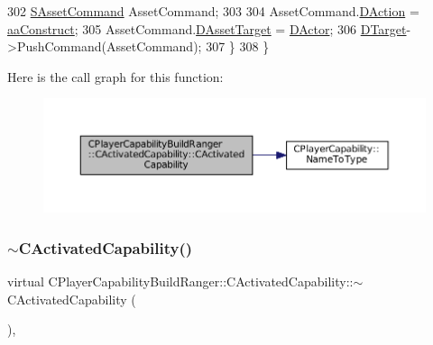 \begin{DoxyCode}
302         \hyperlink{structSAssetCommand}{SAssetCommand} AssetCommand;
303 
304         AssetCommand.\hyperlink{structSAssetCommand_a8edd3b3d59a76d5514ba403bc8076a75}{DAction} = \hyperlink{GameDataTypes_8h_ab47668e651a3032cfb9c40ea2d60d670a7ef6b863f66dd7dcc95a199cd758ae1d}{aaConstruct};
305         AssetCommand.\hyperlink{structSAssetCommand_a3d9b43f6e59c386c48c41a65448a0c39}{DAssetTarget} = \hyperlink{classCActivatedPlayerCapability_a54ca944b47bff2718330639941d402b0}{DActor};
306         \hyperlink{classCActivatedPlayerCapability_a8a1cf50b6501bcfd55af0c935828e395}{DTarget}->PushCommand(AssetCommand);
307     \}
308 \}
\end{DoxyCode}
Here is the call graph for this function\+:\nopagebreak
\begin{figure}[H]
\begin{center}
\leavevmode
\includegraphics[width=350pt]{classCPlayerCapabilityBuildRanger_1_1CActivatedCapability_a8b462671b0888c5374f4196b04d411d6_cgraph}
\end{center}
\end{figure}
\hypertarget{classCPlayerCapabilityBuildRanger_1_1CActivatedCapability_afd5d1ba5ad2b35faa67e4574627d46e1}{}\label{classCPlayerCapabilityBuildRanger_1_1CActivatedCapability_afd5d1ba5ad2b35faa67e4574627d46e1} 
\subsubsection{\texorpdfstring{$\sim$\+C\+Activated\+Capability()}{~CActivatedCapability()}}
{\footnotesize\ttfamily virtual C\+Player\+Capability\+Build\+Ranger\+::\+C\+Activated\+Capability\+::$\sim$\+C\+Activated\+Capability (\begin{DoxyParamCaption}{ }\end{DoxyParamCaption})\hspace{0.3cm}{\ttfamily [inline]}, {\ttfamily [virtual]}}



